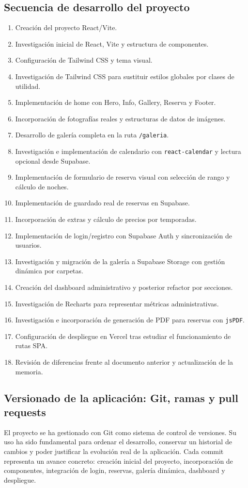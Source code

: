 \documentclass[11pt,a4paper]{article}
\begin{document}
\subsection{Secuencia de desarrollo del proyecto}
\begin{enumerate}[leftmargin=1.4cm]
  \item Creación del proyecto React/Vite.
  \item Investigación inicial de React, Vite y estructura de componentes.
  \item Configuración de Tailwind CSS y tema visual.
  \item Investigación de Tailwind CSS para sustituir estilos globales por clases de utilidad.
  \item Implementación de home con Hero, Info, Gallery, Reserva y Footer.
  \item Incorporación de fotografías reales y estructuras de datos de imágenes.
  \item Desarrollo de galería completa en la ruta \texttt{/galeria}.
  \item Investigación e implementación de calendario con \texttt{react-calendar} y lectura opcional desde Supabase.
  \item Implementación de formulario de reserva visual con selección de rango y cálculo de noches.
  \item Implementación de guardado real de reservas en Supabase.
  \item Incorporación de extras y cálculo de precios por temporadas.
  \item Implementación de login/registro con Supabase Auth y sincronización de usuarios.
  \item Investigación y migración de la galería a Supabase Storage con gestión dinámica por carpetas.
  \item Creación del dashboard administrativo y posterior refactor por secciones.
  \item Investigación de Recharts para representar métricas administrativas.
  \item Investigación e incorporación de generación de PDF para reservas con \texttt{jsPDF}.
  \item Configuración de despliegue en Vercel tras estudiar el funcionamiento de rutas SPA.
  \item Revisión de diferencias frente al documento anterior y actualización de la memoria.
\end{enumerate}

\subsection{Versionado de la aplicación: Git, ramas y pull requests}
El proyecto se ha gestionado con Git como sistema de control de versiones. Su uso ha sido fundamental para ordenar el desarrollo, conservar un historial de cambios y poder justificar la evolución real de la aplicación. Cada commit representa un avance concreto: creación inicial del proyecto, incorporación de componentes, integración de login, reservas, galería dinámica, dashboard y despliegue.
\end{document}
